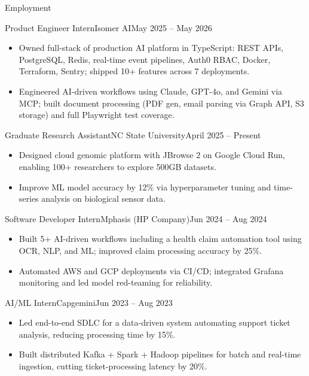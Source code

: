 \documentclass[]{mcdowellcv}
\begin{document}
\makeheader

\begin{cvsection}{Employment}
  \begin{cvsubsection}{Product Engineer Intern}{Isomer AI}{May 2025 -- May 2026}
    \begin{itemize}
      \item Owned full-stack of production AI platform in TypeScript: REST APIs, PostgreSQL, Redis, real-time event pipelines, Auth0 RBAC, Docker, Terraform, Sentry; shipped 10+ features across 7 deployments.
      \item Engineered AI-driven workflows using Claude, GPT-4o, and Gemini via MCP; built document processing (PDF gen, email parsing via Graph API, S3 storage) and full Playwright test coverage.
    \end{itemize}
    \vspace{-1.5pt}
  \end{cvsubsection}

  \begin{cvsubsection}{Graduate Research Assistant}{NC State University}{April 2025 -- Present}
    \begin{itemize}
      \item Designed cloud genomic platform with JBrowse 2 on Google Cloud Run, enabling 100+ researchers to explore 500GB datasets.
      \item Improve ML model accuracy by 12\% via hyperparameter tuning and time-series analysis on biological sensor data.
    \end{itemize}
    \vspace{-1.5pt}
  \end{cvsubsection}

  \begin{cvsubsection}{Software Developer Intern}{Mphasis (HP Company)}{Jun 2024 -- Aug 2024}
    \begin{itemize}
      \item Built 5+ AI-driven workflows including a health claim automation tool using OCR, NLP, and ML; improved claim processing accuracy by 25\%.
      \item Automated AWS and GCP deployments via CI/CD; integrated Grafana monitoring and led model red-teaming for reliability.
    \end{itemize}
    \vspace{-1.5pt}
  \end{cvsubsection}

  \begin{cvsubsection}{AI/ML Intern}{Capgemini}{Jun 2023 -- Aug 2023}
    \begin{itemize}
      \item Led end-to-end SDLC for a data-driven system automating support ticket analysis, reducing processing time by 15\%.
      \item Built distributed Kafka + Spark + Hadoop pipelines for batch and real-time ingestion, cutting ticket-processing latency by 20\%.
    \end{itemize}
    \vspace{-1.5pt}
  \end{cvsubsection}
\end{cvsection}
\end{document}
